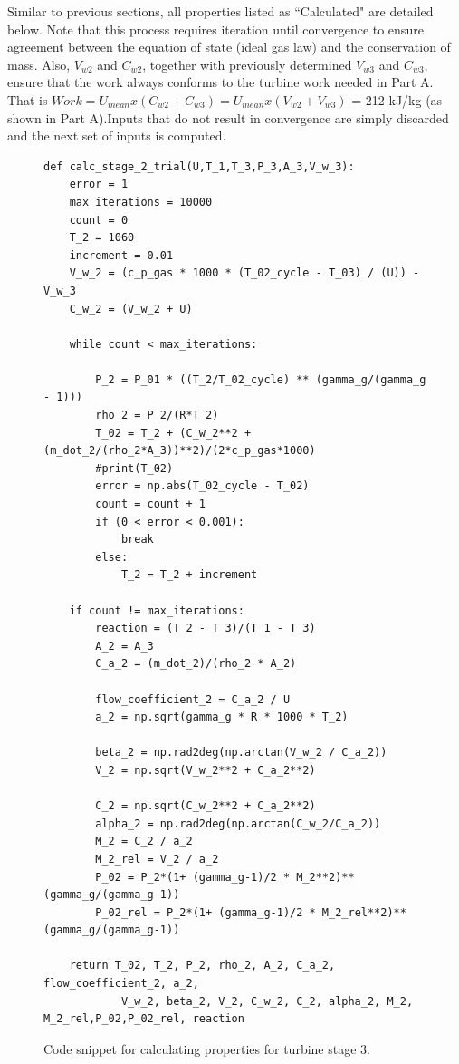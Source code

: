 \documentclass[12pt, letter]{report}
\begin{document}
Similar to previous sections, all properties listed as ``Calculated" are detailed below. Note that this process requires iteration until convergence to ensure agreement between the equation of state (ideal gas law) and the conservation of mass. Also, $V_{w2}$ and $C_{w2}$, together with previously determined $V_{w3}$ and $C_{w3}$, ensure that the work always conforms to the turbine work needed in Part A. That is $Work = U_{mean} x (C_{w2} + C_{w3}) = U_{mean} x (V_{w2} + V_{w3})$ = 212 kJ/kg (as shown in Part A).Inputs that do not result in convergence are simply discarded and the next set of inputs is computed.

\par



\begin{figure}[H]
    \begin{verbatim}
def calc_stage_2_trial(U,T_1,T_3,P_3,A_3,V_w_3):
    error = 1
    max_iterations = 10000
    count = 0
    T_2 = 1060
    increment = 0.01
    V_w_2 = (c_p_gas * 1000 * (T_02_cycle - T_03) / (U)) - V_w_3
    C_w_2 = (V_w_2 + U)

    while count < max_iterations:
        
        P_2 = P_01 * ((T_2/T_02_cycle) ** (gamma_g/(gamma_g - 1))) 
        rho_2 = P_2/(R*T_2)
        T_02 = T_2 + (C_w_2**2 + (m_dot_2/(rho_2*A_3))**2)/(2*c_p_gas*1000)
        #print(T_02)
        error = np.abs(T_02_cycle - T_02) 
        count = count + 1
        if (0 < error < 0.001):
            break
        else:
            T_2 = T_2 + increment
    
    if count != max_iterations:
        reaction = (T_2 - T_3)/(T_1 - T_3)
        A_2 = A_3
        C_a_2 = (m_dot_2)/(rho_2 * A_2) 

        flow_coefficient_2 = C_a_2 / U
        a_2 = np.sqrt(gamma_g * R * 1000 * T_2)
        
        beta_2 = np.rad2deg(np.arctan(V_w_2 / C_a_2))
        V_2 = np.sqrt(V_w_2**2 + C_a_2**2)
        
        C_2 = np.sqrt(C_w_2**2 + C_a_2**2)
        alpha_2 = np.rad2deg(np.arctan(C_w_2/C_a_2))
        M_2 = C_2 / a_2
        M_2_rel = V_2 / a_2
        P_02 = P_2*(1+ (gamma_g-1)/2 * M_2**2)**(gamma_g/(gamma_g-1))
        P_02_rel = P_2*(1+ (gamma_g-1)/2 * M_2_rel**2)**(gamma_g/(gamma_g-1))

    return T_02, T_2, P_2, rho_2, A_2, C_a_2, flow_coefficient_2, a_2,
            V_w_2, beta_2, V_2, C_w_2, C_2, alpha_2, M_2, M_2_rel,P_02,P_02_rel, reaction

    \end{verbatim}
    \caption{Code snippet for calculating properties for turbine stage 3.}
    \label{fig:code_stage_2}
\end{figure}
\end{document}
